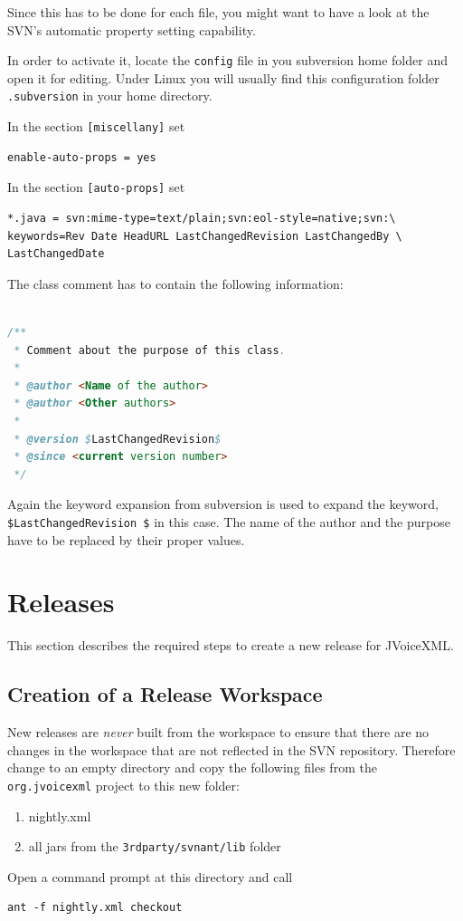 \documentclass[11pt,a4paper]{article}
\begin{document}
Since this has to be done for each file, you might want to have a look
at the SVN's automatic property setting capability.

In order to activate it, locate the \texttt{config} file in you subversion home
folder and open it for editing. Under Linux you will usually find this
configuration folder \texttt{.subversion} in your home directory.

In the section \texttt{[miscellany]} set
\begin{lstlisting}
enable-auto-props = yes
\end{lstlisting}

In the section \texttt{[auto-props]} set
\begin{lstlisting}
*.java = svn:mime-type=text/plain;svn:eol-style=native;svn:\
keywords=Rev Date HeadURL LastChangedRevision LastChangedBy \
LastChangedDate
\end{lstlisting}

The class comment has to contain the following information:

\begin{lstlisting}[language=Java]

/**
 * Comment about the purpose of this class.
 *
 * @author <Name of the author>
 * @author <Other authors>
 *
 * @version $LastChangedRevision$
 * @since <current version number>
 */
\end{lstlisting}

Again the keyword expansion from subversion is used to expand the keyword,
\texttt{\$LastChangedRevision \$} in this case. The name of the author and the 
purpose have to be replaced by their proper values.

\section{Releases}

This section describes the required steps to create a new release for
JVoice\-XML.

\subsection{Creation of a Release Workspace}

New releases are \emph{never} built from the workspace to ensure that there are
no changes in the workspace that are not reflected in the SVN repository.
Therefore change to an empty directory and copy the following files from the
\texttt{org.jvoicexml} project to this new folder:
\begin{enumerate}
  \item nightly.xml
  \item all jars from the \texttt{3rdparty/svnant/lib} folder
\end{enumerate}
Open a command prompt at this directory and call
\begin{lstlisting}
ant -f nightly.xml checkout
\end{lstlisting}
\end{document}
